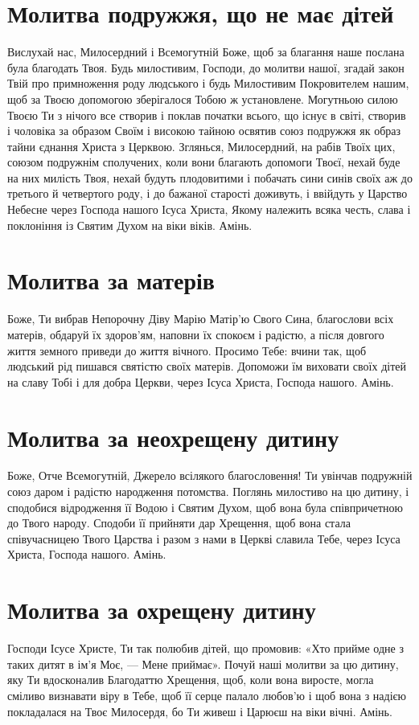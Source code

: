 \documentclass[chapters.tex]{subfiles}
\begin{document}
\section{Молитва подружжя, що не має дітей}
Вислухай нас, Милосердний і Всемогутній Боже, щоб за благання наше послана була благодать Твоя. Будь милостивим, Господи, до молитви нашої, згадай закон Твій про примноження роду людського і будь Милостивим Покровителем нашим, щоб за Твоєю допомогою зберігалося Тобою ж установлене. Могутньою силою Твоєю Ти з нічого все створив і поклав початки всього, що існує в світі, створив і чоловіка за образом Своїм і високою тайною освятив союз подружжя як образ тайни єднання Христа з Церквою. Зглянься, Милосердний, на рабів Твоїх цих, союзом подружнім сполучених, коли вони благають допомоги Твоєї, нехай буде на них милість Твоя, нехай будуть плодовитими і побачать сини синів своїх аж до третього й четвертого роду, і до бажаної старості доживуть, і ввійдуть у Царство Небесне через Господа нашого Ісуса Христа, Якому належить всяка честь, слава і поклоніння із Святим Духом на віки віків. Амінь.

\section{Молитва за матерів}
Боже, Ти вибрав Непорочну Діву Марію Матір’ю Свого Сина, благослови всіх матерів, обдаруй їх здоров’ям, наповни їх спокоєм і радістю, а після довгого життя земного приведи до життя вічного. Просимо Тебе: вчини так, щоб людський рід пишався святістю своїх матерів. Допоможи їм виховати своїх дітей на славу Тобі і для добра Церкви, через Ісуса Христа, Господа нашого. Амінь.

\section{Молитва за неохрещену дитину}
Боже, Отче Всемогутній, Джерело всілякого благословення! Ти увінчав подружній союз даром і радістю народження потомства. Поглянь милостиво на цю дитину, і сподобися відродження її Водою і Святим Духом, щоб вона була співпричетною до Твого народу. Сподоби її прийняти дар Хрещення, щоб вона стала співучасницею Твого Царства і разом з нами в Церкві славила Тебе, через Ісуса Христа, Господа нашого. Амінь.

\section{Молитва за охрещену дитину}
Господи Ісусе Христе, Ти так полюбив дітей, що промовив: «Хто прийме одне з таких дитят в ім’я Моє, — Мене приймає». Почуй наші молитви за цю дитину, яку Ти вдосконалив Благодаттю Хрещення, щоб, коли вона виросте, могла сміливо визнавати віру в Тебе, щоб її серце палало любов’ю і щоб вона з надією покладалася на Твоє Милосердя, бо Ти живеш і Царюєш на віки вічні. Амінь.
\end{document}
